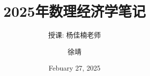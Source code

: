     

\documentclass[lang=cn,10pt,green]{elegantbook} 
\title{2025年数理经济学笔记}
\subtitle{授课: 杨佳楠老师}

\author{徐靖}
\date{Febuary 27, 2025}


\setcounter{tocdepth}{3}


\usepackage{array}
\newcommand{\ccr}[1]{\makecell{{\color{#1}\rule{1cm}{1cm}}}}




\maketitle
\frontmatter

\tableofcontents

\mainmatter

\chapter{Topology of $\mathbb{R}^N$}

\begin{introduction}[Keywords]
    \item Topology 拓扑
    \item Metric Space 度量空间
    \item Convergence 收敛
    \item interior 内部
    \item closure 闭包
    \item boundary 边界
    \item compact set 紧集
    \item cluster point 聚点
\end{introduction}

\section{Metric Spaces}
